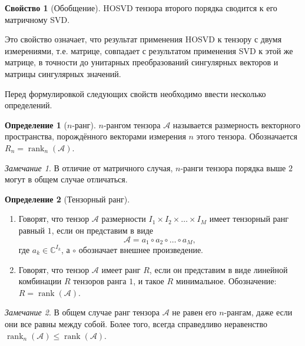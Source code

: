 \documentclass[specialist,
    substylefile = spbu_report.rtx,
    subf,href,colorlinks=true, 12pt]{disser}
\theoremstyle{plain}
\theoremstyle{definition}
\newtheorem{definition}{Определение}[section]
\newtheorem{property}{Свойство}[section]
\theoremstyle{remark}
\newtheorem*{remark}{Замечание}
\begin{document}
    \begin{property}[Обобщение]
        HOSVD тензора второго порядка сводится к его матричному SVD\@.
    \end{property}
    Это свойство означает, что результат применения HOSVD к тензору с двумя измерениями, т.е. матрице, совпадает
    с результатом применения SVD к этой же матрице, в точности до унитарных преобразований сингулярных векторов и
    матрицы сингулярных значений.

    Перед формулировкой следующих свойств необходимо ввести несколько определений.
    \begin{definition}[$n$-ранг]
        $n$-рангом тензора $\mathcal{A}$ называется размерность векторного пространства, порождённого векторами измерения $n$ этого тензора.
        Обозначается $R_n=\operatorname{rank}_{n}(\mathcal{A})$.
    \end{definition}

    \begin{remark}
        В отличие от матричного случая, $n$-ранги тензора порядка выше $2$ могут в общем случае отличаться.
    \end{remark}

    \begin{definition}[Тензорный ранг]
        \leavevmode
        \begin{enumerate}
            \item Говорят, что тензор $\mathcal{A}$ размерности $I_1\times I_2\times \ldots \times I_M$ имеет тензорный ранг равный $1$, если он представим в виде
            \[
                \mathcal{A}=a_1\circ a_2\circ \ldots \circ a_M,
            \]
            где $a_{k} \in \mathbb{C}^{I_k}$, а $\circ$ обозначает внешнее произведение.
            \item Говорят, что тензор $\mathcal{A}$ имеет ранг $R$, если он представим в виде линейной комбинации $R$ тензоров
            ранга $1$, и такое $R$ минимальное.
            Обозначение: $R=\operatorname{rank}(\mathcal{A})$.
        \end{enumerate}
    \end{definition}

    \begin{remark}
        В общем случае ранг тензора $\mathcal{A}$ не равен его $n$-рангам, даже если они все равны между собой.
        Более того, всегда справедливо неравенство $\operatorname{rank}_n(\mathcal{A})\leqslant \operatorname{rank}(\mathcal{A})$.
    \end{remark}
\end{document}
